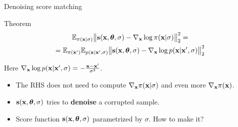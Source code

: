 \begin{frame}{Denoising score matching}
	\begin{block}{Theorem}
		\vspace{-0.8cm}
		\begin{multline*}
			\mathbb{E}_{\pi(\mathbf{x} | \sigma)}\bigl\| \mathbf{s}(\mathbf{x}, \boldsymbol{\theta}, \sigma) - \nabla_{\mathbf{x}} \log \pi(\mathbf{x} | \sigma) \bigr\|^2_2 = \\ = \mathbb{E}_{\pi(\mathbf{x}')} \mathbb{E}_{p(\mathbf{x} | \mathbf{x}', \sigma)}\bigl\| \mathbf{s}(\mathbf{x}, \boldsymbol{\theta}, \sigma) - \nabla_{\mathbf{x}} \log p(\mathbf{x} | \mathbf{x}', \sigma) \bigr\|^2_2	
		\end{multline*}
		\vspace{-0.8cm}
	\end{block}
	Here $\nabla_{\mathbf{x}} \log p(\mathbf{x} | \mathbf{x}', \sigma) = - \frac{\mathbf{x} - \mathbf{x}'}{\sigma^2}$.
	\begin{itemize}
		\item The RHS does not need to compute $\nabla_{\mathbf{x}} \pi(\mathbf{x} | \sigma)$ and even more $\nabla_{\mathbf{x}} \pi(\mathbf{x})$.
		\item $\mathbf{s}(\mathbf{x}, \boldsymbol{\theta}, \sigma)$ tries to \textbf{denoise} a corrupted sample.
		\item Score function $\mathbf{s}(\mathbf{x}, \boldsymbol{\theta}, \sigma)$ parametrized by $\sigma$. How to make it?
	\end{itemize}
\end{frame}
